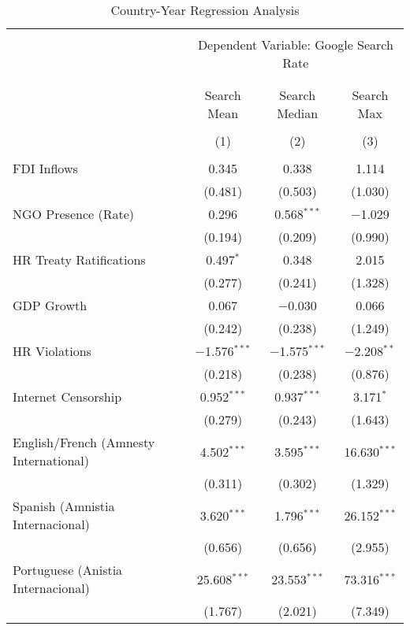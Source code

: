 
\begin{table}[!htbp] \centering 
  \caption{Country-Year Regression Analysis} 
  \label{} 
\begin{tabular}{@{\extracolsep{5pt}}lccc} 
\\[-1.8ex]\hline 
\hline \\[-1.8ex] 
 & \multicolumn{3}{c}{Dependent Variable: Google Search Rate} \\ 
\cline{2-4} 
\\[-1.8ex] & \multicolumn{3}{c}{ } \\ 
 & Search Mean & Search Median & Search Max \\ 
\\[-1.8ex] & (1) & (2) & (3)\\ 
\hline \\[-1.8ex] 
 FDI Inflows & 0.345 & 0.338 & 1.114 \\ 
  & (0.481) & (0.503) & (1.030) \\ 
  NGO Presence (Rate) & 0.296 & 0.568$^{***}$ & $-$1.029 \\ 
  & (0.194) & (0.209) & (0.990) \\ 
  HR Treaty Ratifications & 0.497$^{*}$ & 0.348 & 2.015 \\ 
  & (0.277) & (0.241) & (1.328) \\ 
  GDP Growth & 0.067 & $-$0.030 & 0.066 \\ 
  & (0.242) & (0.238) & (1.249) \\ 
  HR Violations & $-$1.576$^{***}$ & $-$1.575$^{***}$ & $-$2.208$^{**}$ \\ 
  & (0.218) & (0.238) & (0.876) \\ 
  Internet Censorship & 0.952$^{***}$ & 0.937$^{***}$ & 3.171$^{*}$ \\ 
  & (0.279) & (0.243) & (1.643) \\ 
  English/French (Amnesty International) & 4.502$^{***}$ & 3.595$^{***}$ & 16.630$^{***}$ \\ 
  & (0.311) & (0.302) & (1.329) \\ 
  Spanish (Amnistia Internacional) & 3.620$^{***}$ & 1.796$^{***}$ & 26.152$^{***}$ \\ 
  & (0.656) & (0.656) & (2.955) \\ 
  Portuguese (Anistia Internacional) & 25.608$^{***}$ & 23.553$^{***}$ & 73.316$^{***}$ \\ 
  & (1.767) & (2.021) & (7.349) \\ 

\end{tabular}
\end{table}
